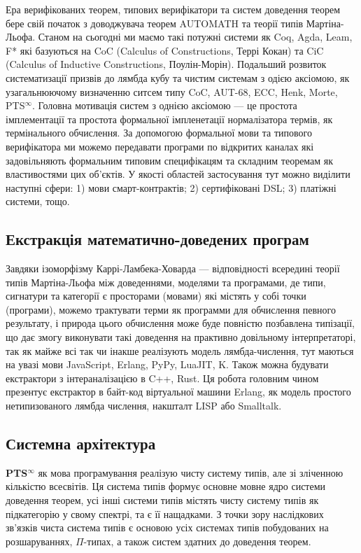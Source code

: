 \documentclass{article}
\begin{document}
Ера верифікованих теорем, типових верифікатори та систем доведення теорем бере свій початок з доводжувача теорем AUTOMATH та теорії типів Мартіна-Льофа.
Станом на сьогодні ми маємо такі потужні системи як Coq, Agda, Leam, F* які базуються на CoC (Calculus of Constructions, Террі Кокан)
та CiC (Calculus of Inductive Constructions, Поулін-Морін). Подальший розвиток систематизації призвів до лямбда кубу та чистим
системам з одією аксіомою, як узагальнюючому визначенню ситсем типу CoC, AUT-68, ECC, Henk, Morte, PTS$^\infty$.
Головна мотивація систем з однією аксіомою — це простота імплементації та простота формальної імпленетації
нормалізатора термів, як термінального обчислення. За допомогою формальної мови та типового верифікатора ми можемо
передавати програми по відкритих каналах які задовільняють формальним типовим специфікацям та складним теоремам як властивостями цих об'єктів.
У якості областей застосування тут можно виділити наступні сфери: 1) мови смарт-контрактів; 2) сертифіковані DSL; 3) платіжні системи, тощо.

\subsection{Екстракція математично-доведених програм}
Завдяки ізоморфізму Каррі-Ламбека-Ховарда — відповідності всередині теорії типів Мартіна-Льофа\cite{Lof84} між доведеннями, моделями та програмами,
де типи, сигнатури та категорії є просторами (мовами) які містять у собі точки (програми), можемо трактувати терми як программи для обчислення певного результату,
і природа цього обчислення може буде повністю позбавлена типізації, що дає змогу виконувати такі доведення на практивно довільному інтерпретаторі,
так як майже всі так чи інакше реалізують модель лямбда-числення, тут маються на увазі мови JavaScript, Erlang, PyPy, LuaJIT, K. Також можна будувати
екстрактори з інтераналізацією в C++, Rust. Ця робота головним чином презентує екстрактор в байт-код віртуальної машини Erlang, як модель
простого нетипизованого лямбда числення, накшталт LISP або Smalltalk.

\subsection{Системна архітектура}
\textbf{PTS$^\infty$} як мова програмування реалізую чисту систему типів, але зі зліченною кількістю всесвітів.
Ця система типів формує основне мовне ядро системи доведення теорем, усі інші системи типів  містять чисту систему типів
як підкатегорію у свому спектрі, та є її нащадками. З точки зору наслідкових зв'язків чиста система типів є
основою усіх системах типів побудованих на розшаруваннях, $\Pi$-типах, а також систем здатних до доведення теорем.
\end{document}
